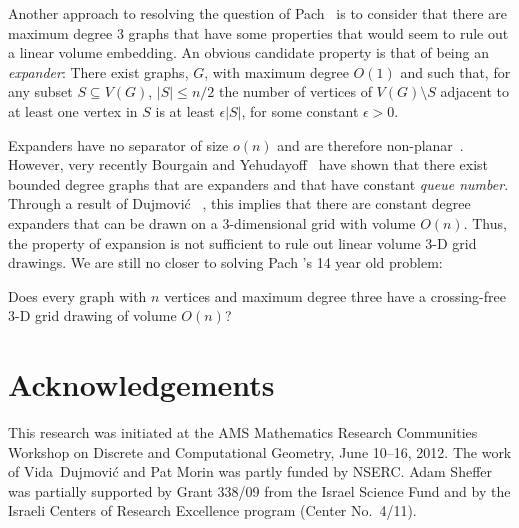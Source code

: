 \documentclass[12pt]{article}
\begin{document}
Another approach to resolving the question of Pach \etal\ is to consider
that there are maximum degree 3 graphs that have some properties that
would seem to rule out a linear volume embedding.  An obvious candidate
property is that of being an \emph{expander}: There exist graphs, $G$,
with maximum degree $O(1)$ and such that, for any subset $S\subseteq
V(G)$, $|S|\le n/2$ the number of vertices of $V(G)\setminus S$ adjacent
to at least one vertex in $S$ is at least $\epsilon|S|$, for some constant
$\epsilon > 0$.

Expanders have no separator of size $o(n)$ and are therefore
non-planar~\cite{lipton.tarjan:separator}.  However, very recently
Bourgain and Yehudayoff~\cite{bourgain.yehudayoff:monotone} have
shown that there exist bounded degree graphs that are expanders and
that have constant \emph{queue number}. Through a result of Dujmovi\'c
\etal~\cite[Theorem~8]{dujmovic.por.ea:track}, this implies that there
are constant degree expanders that can be drawn on a 3-dimensional grid
with volume $O(n)$. Thus, the property of expansion is not sufficient
to rule out linear volume 3-D grid drawings.  We are still no closer
to solving Pach \etal's 14 year old problem:

\begin{op}
  Does every graph with $n$ vertices and maximum degree three have a
  crossing-free 3-D grid drawing of volume $O(n)$?
\end{op}


\section*{Acknowledgements}

This research was initiated at the AMS Mathematics Research Communities
Workshop on Discrete and Computational Geometry, June 10--16, 2012.
The work of Vida~Dujmovi\'c and Pat Morin was partly funded by NSERC.
Adam Sheffer was partially supported by Grant 338/09 from the Israel
Science Fund and by the Israeli Centers of Research Excellence program
(Center No.~4/11).

%
%
\end{document}
